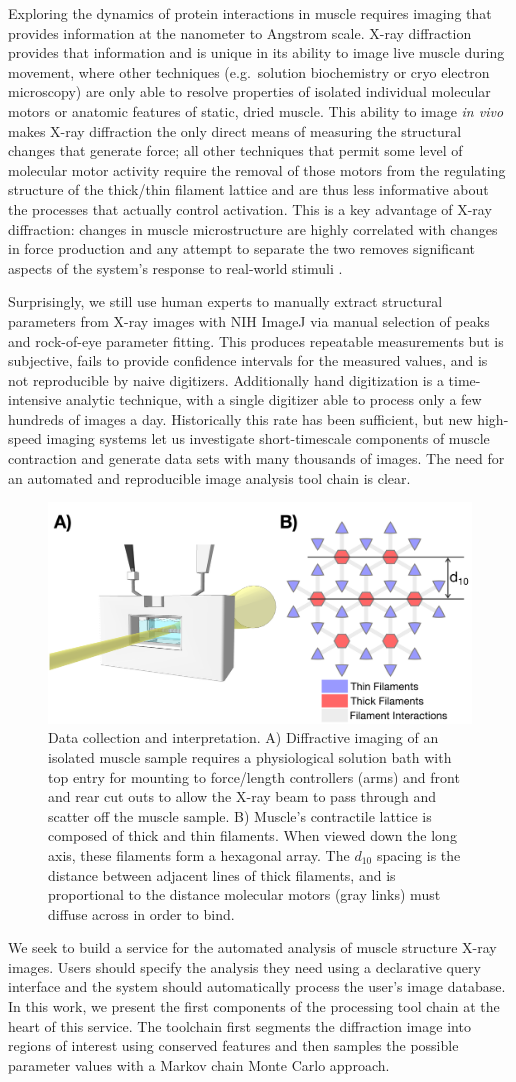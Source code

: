 \documentclass{llncs}
\newcommand{\figurerig}{
\begin{figure}[tbp]
  \centering
  \includegraphics[width=.8\linewidth]{figures/rig_and_lattice}
  \caption{\label{fig:rig}
    Data collection and interpretation.  
    A) Diffractive imaging of an isolated muscle sample requires a
    physiological solution bath with top entry for mounting to
    force/length controllers (arms) and front and rear cut outs to
    allow the X-ray beam to pass through and scatter off the muscle
    sample. B) Muscle's contractile lattice is composed of thick and
    thin filaments. When viewed down the long axis, these filaments
    form a hexagonal array. The $d_{10}$ spacing is the distance
    between adjacent lines of thick filaments, and is proportional to
    the distance molecular motors (gray links) must diffuse across in
    order to bind. 
	}
	\vspace{-10pt}
\end{figure}
}
\begin{document}
Exploring the dynamics of protein interactions in muscle requires
imaging that provides information at the nanometer to Angstrom scale.
X-ray diffraction provides that information and is unique in its
ability to image live muscle during movement, where other techniques
(e.g.\ solution biochemistry or cryo electron microscopy) are only able
to resolve properties of isolated individual molecular motors or
anatomic features of static, dried muscle. This ability to image
\textit{in vivo} makes X-ray diffraction the only direct means of
measuring the structural changes that generate force; all other
techniques that permit some level of molecular motor activity require
the removal of those motors from the regulating structure of the
thick/thin filament lattice and are thus less informative about the
processes that actually control activation.  This is a key advantage
of X-ray diffraction: changes in muscle microstructure are highly
correlated with changes in force production and any attempt to
separate the two removes significant aspects of the system's response
to real-world stimuli \cite{BrennerYu1985,Bagni1994}.

Surprisingly, we still use human experts to manually extract
structural parameters from X-ray images with NIH ImageJ via manual
selection of peaks and rock-of-eye parameter fitting. This produces
repeatable measurements but is subjective, fails to provide confidence
intervals for the measured values, and is not reproducible by naive
digitizers. Additionally hand digitization is a time-intensive
analytic technique, with a single digitizer able to process only a few
hundreds of images a day.  Historically this rate has been sufficient,
but new high-speed imaging systems let us investigate short-timescale
components of muscle contraction and generate data sets with many
thousands of images. The need for an automated and reproducible image
analysis tool chain is clear. 

\figurerig

We seek to build a service for the automated analysis of muscle
structure X-ray images. Users should specify the analysis they need
using a declarative query interface and the system should
automatically process the user's image database. In this work, we
present the first components of the processing tool chain at the heart
of this service. The toolchain first segments the
diffraction image into regions of interest using conserved features
and then samples the possible parameter values with a Markov chain
Monte Carlo approach.
\end{document}
